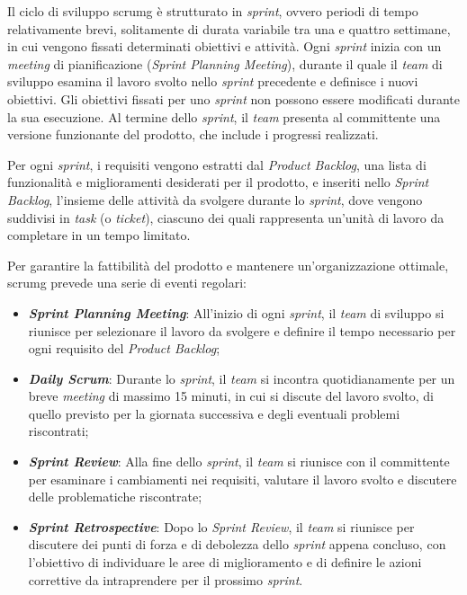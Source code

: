 Il ciclo di sviluppo \gls{scrumg} è strutturato in \emph{sprint}, ovvero periodi di tempo relativamente brevi, solitamente di durata variabile tra una e quattro settimane, in cui vengono fissati determinati obiettivi e attività. Ogni \emph{sprint} inizia con un \emph{meeting} di pianificazione (\textit{Sprint Planning Meeting}), durante il quale il \emph{team} di sviluppo esamina il lavoro svolto nello \emph{sprint} precedente e definisce i nuovi obiettivi. Gli obiettivi fissati per uno \emph{sprint} non possono essere modificati durante la sua esecuzione. Al termine dello \emph{sprint}, il \emph{team} presenta al committente una versione funzionante del prodotto, che include i progressi realizzati.

Per ogni \emph{sprint}, i requisiti vengono estratti dal \textit{Product Backlog}, una lista di funzionalità e miglioramenti desiderati per il prodotto, e inseriti nello \textit{Sprint Backlog}, l'insieme delle attività da svolgere durante lo \emph{sprint}, dove vengono suddivisi in \emph{task} (o \emph{ticket}), ciascuno dei quali rappresenta un'unità di lavoro da completare in un tempo limitato.

Per garantire la fattibilità del prodotto e mantenere un'organizzazione ottimale, \gls{scrumg} prevede una serie di eventi regolari:

\begin{itemize}
    \item \textbf{\emph{Sprint Planning Meeting}}: All'inizio di ogni \emph{sprint}, il \emph{team} di sviluppo si riunisce per selezionare il lavoro da svolgere e definire il tempo necessario per ogni requisito del \textit{Product Backlog};
    \item \textbf{\emph{Daily Scrum}}: Durante lo \emph{sprint}, il \emph{team} si incontra quotidianamente per un breve \emph{meeting} di massimo 15 minuti, in cui si discute del lavoro svolto, di quello previsto per la giornata successiva e degli eventuali problemi riscontrati;
    \item \textbf{\emph{Sprint Review}}: Alla fine dello \emph{sprint}, il \emph{team} si riunisce con il committente per esaminare i cambiamenti nei requisiti, valutare il lavoro svolto e discutere delle problematiche riscontrate;
    \item \textbf{\emph{Sprint Retrospective}}: Dopo lo \emph{Sprint Review}, il \emph{team} si riunisce per discutere dei punti di forza e di debolezza dello \emph{sprint} appena concluso, con l'obiettivo di individuare le aree di miglioramento e di definire le azioni correttive da intraprendere per il prossimo \emph{sprint}.
\end{itemize}

